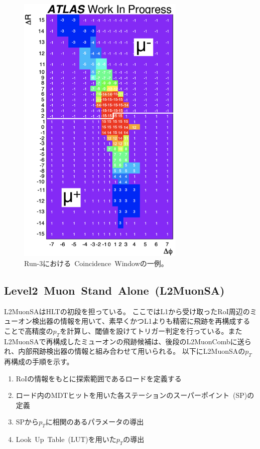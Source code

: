 \begin{figure}[h]
  \centering
  \includegraphics[clip, width=8cm]{fig/3/Run3CW.pdf}
  \caption{Run-3における~Coincidence~Windowの一例\cite{article:shiomi}。}
  \label{fig:3-5}
\end{figure}


\subsection{Level2~Muon~Stand~Alone~(L2MuonSA)}\label{chapter3-2-2}
L2MuonSAはHLTの初段を担っている。
ここではL1から受け取ったRoI周辺のミューオン検出器の情報を用いて、素早くかつL1よりも精密に飛跡を再構成することで高精度の$p_T$を計算し、閾値を設けてトリガー判定を行っている。またL2MuonSAで再構成したミューオンの飛跡候補は、後段のL2MuonCombに送られ、内部飛跡検出器の情報と組み合わせて用いられる。
以下にL2MuonSAの$p_T$再構成の手順を示す。
\begin{enumerate}
    \item RoIの情報をもとに探索範囲であるロードを定義する
    \item ロード内のMDTヒットを用いた各ステーションのスーパーポイント~(SP)の定義
    \item SPから$p_T$に相関のあるパラメータの導出
    \item Look~Up~Table~(LUT)を用いた$p_T$の導出
\end{enumerate}

